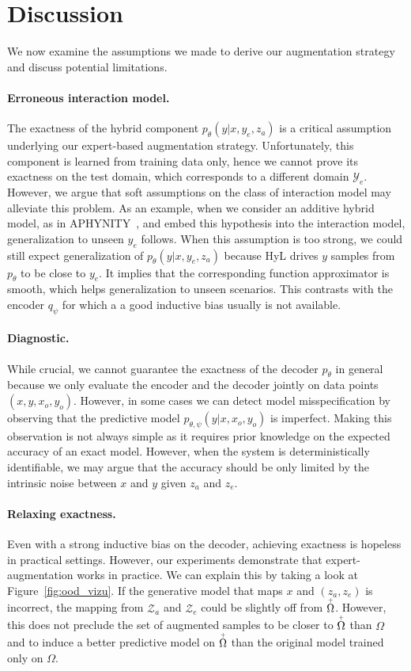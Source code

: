 \documentclass{article}
\newcommand\figref{Figure~\ref}
\begin{document}
\section{Discussion}
We now examine the assumptions we made to derive our augmentation strategy and discuss potential limitations.
\paragraph{Erroneous interaction model.}
The exactness of the hybrid component $p_\theta(y|x, y_e, z_a)$ is a critical assumption underlying our expert-based augmentation strategy. Unfortunately, this component is learned from training data only, hence we cannot prove its exactness on the test domain, which corresponds to a different domain $\mathcal{Y}_e$. However, we argue that soft assumptions on the class of interaction model may alleviate this problem. As an example, when we consider an additive hybrid model, as in APHYNITY~\citep{APHYNITY}, and embed this hypothesis into the interaction model, generalization to unseen $y_e$ follows. When this assumption is too strong, we could still expect generalization of $p_\theta(y|x, y_e, z_a)$ because HyL drives $y$ samples from $p_\theta$ to be close to $y_e$. It implies that the corresponding function approximator is smooth, which helps generalization to unseen scenarios. This contrasts with the encoder $q_\psi$ for which a a good inductive bias usually is not available. 
\paragraph{Diagnostic.}
While crucial, we cannot guarantee the exactness of the decoder $p_\theta$ in general because we only evaluate the encoder and the decoder jointly on data points $(x, y, x_o, y_o)$. However, in some cases we can detect model misspecification by observing that the predictive model $p_{\theta, \psi}(y|x, x_o, y_o)$ is imperfect. Making this observation is not always simple as it requires prior knowledge on the expected accuracy of an exact model. However, when the system is deterministically identifiable, we may argue that the accuracy should be only limited by the intrinsic noise between $x$ and $y$ given $z_a$ and $z_e$.

\paragraph{Relaxing exactness.}
Even with a strong inductive bias on the decoder, achieving exactness is hopeless in practical settings. However, our experiments demonstrate that expert-augmentation works in practice. We can explain this by taking a look at \figref{fig:ood_vizu}. If the generative model that maps $x$ and $(z_a, z_e)$ is incorrect, the mapping from $\mathcal{Z}_a$ and $\mathcal{Z}_e$ could be slightly off from $\accentset{+}{\Omega}$.  However, this does not preclude the set of augmented samples to be closer to $\accentset{+}{\Omega}$ than $\Omega$ and to induce a better predictive model on $\accentset{+}{\Omega}$ than the original model trained only on $\Omega$.
\end{document}
